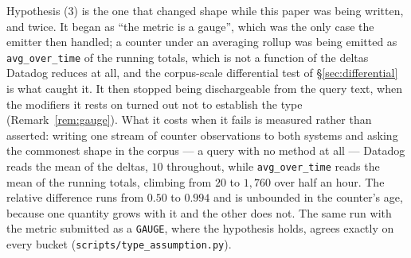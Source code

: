 \begin{remark}\label{rem:type-cost}
Hypothesis (3) is the one that changed shape while this paper was being written, and
twice. It began as ``the metric is a gauge'', which was the only case the emitter then
handled; a counter under an averaging rollup was being emitted as
\texttt{avg\_over\_time} of the running totals, which is not a function of the deltas
Datadog reduces at all, and the corpus-scale differential test of \S\ref{sec:differential}
is what caught it. It then stopped being dischargeable from the query text, when the
modifiers it rests on turned out not to establish the type (Remark~\ref{rem:gauge}).
What it costs when it fails is measured rather than asserted: writing one stream of
counter observations to both systems and asking the commonest shape in the corpus ---
a query with no method at all --- Datadog reads the mean of the deltas, $10$ throughout,
while \texttt{avg\_over\_time} reads the mean of the running totals, climbing from $20$
to $1{,}760$ over half an hour. The relative difference runs from $0.50$ to $0.994$ and
is unbounded in the counter's age, because one quantity grows with it and the other does
not. The same run with the metric submitted as a \texttt{GAUGE}, where the hypothesis
holds, agrees exactly on every bucket (\texttt{scripts\slash type\_assumption.py}).
\end{remark}

